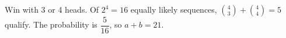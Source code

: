Win with 3 or 4 heads. Of $2^4=16$ equally likely sequences, $\binom 43+\binom 44=5$ qualify. The probability is $\dfrac{5}{16}$, so $a+b=\boxed{21}$.
